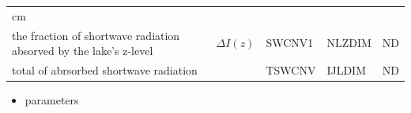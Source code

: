 \begin{longtable}[]{@{}lllll@{}}
\begin{minipage}[t]{0.10\columnwidth}
\(\mathrm{cm}\)\strut
\end{minipage}\tabularnewline
\begin{minipage}[t]{0.44\columnwidth}\raggedright
the fraction of shortwave radiation absorved by the lake's z-level\strut
\end{minipage} & \begin{minipage}[t]{0.15\columnwidth}\raggedright
\(\Delta I(z)\)\strut
\end{minipage} & \begin{minipage}[t]{0.07\columnwidth}\raggedright
SWCNV1\strut
\end{minipage} & \begin{minipage}[t]{0.10\columnwidth}\raggedright
NLZDIM\strut
\end{minipage} & \begin{minipage}[t]{0.10\columnwidth}\raggedright
\(\mathrm{ND}\)\strut
\end{minipage}\tabularnewline
\begin{minipage}[t]{0.44\columnwidth}\raggedright
total of abrsorbed shortwave radiation\strut
\end{minipage} & \begin{minipage}[t]{0.15\columnwidth}\raggedright
\strut
\end{minipage} & \begin{minipage}[t]{0.07\columnwidth}\raggedright
TSWCNV\strut
\end{minipage} & \begin{minipage}[t]{0.10\columnwidth}\raggedright
IJLDIM\strut
\end{minipage} & \begin{minipage}[t]{0.10\columnwidth}\raggedright
\(\mathrm{ND}\)\strut
\end{minipage}\tabularnewline
\bottomrule
\end{longtable}

\begin{itemize}
\tightlist
\item
  parameters
\end{itemize}


